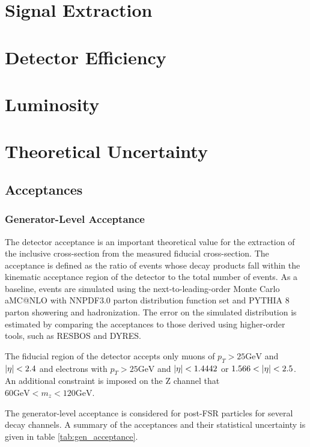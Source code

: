 \documentclass[aps,prd,final,twocolumn,letterpaper]{revtex4}
\begin{document}
	\section{Signal Extraction}
	\section{Detector Efficiency}
	\section{Luminosity}
	\section{Theoretical Uncertainty}
		\subsection{Acceptances}
			\subsubsection{Generator-Level Acceptance}
			The detector acceptance is an important theoretical value for the extraction of the inclusive cross-section from the measured fiducial cross-section. The acceptance is defined as the ratio of events whose decay products fall within the kinematic acceptance region of the detector to the total number of events. As a baseline, events are simulated using the next-to-leading-order Monte Carlo aMC@NLO with NNPDF3.0 parton distribution function set and PYTHIA 8 parton showering and hadronization. The error on the simulated distribution is estimated by comparing the acceptances to those derived using higher-order tools, such as RESBOS and DYRES.
			
			The fiducial region of the detector accepts only muons of $p_{T} > 25\si{\giga\electronvolt}$ and $\abs{\eta} < 2.4$ and electrons with $p_{T} > 25\si{\giga\electronvolt}$ and $\abs{\eta} < 1.4442$ or $1.566 < \abs{\eta} < 2.5$. An additional constraint is imposed on the Z channel that $60\si{\giga\electronvolt} < m_{z} < 120\si{\giga\electronvolt}$.
			
			The generator-level acceptance is considered for post-FSR particles for several decay channels. A summary of the acceptances and their statistical uncertainty is given in table \ref{tab:gen_acceptance}.
			
\end{document}
